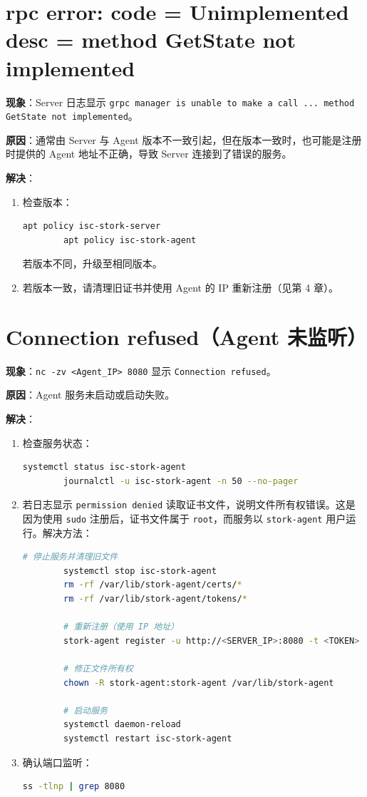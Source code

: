 \documentclass[UTF8, a4paper, 11pt, oneside]{ctexbook}
\begin{document}
\section{rpc error: code = Unimplemented desc = method GetState not implemented}

\textbf{现象}：Server 日志显示 \texttt{grpc manager is unable to make a call ... method GetState not implemented}。

\textbf{原因}：通常由 Server 与 Agent 版本不一致引起，但在版本一致时，也可能是注册时提供的 Agent 地址不正确，导致 Server 连接到了错误的服务。

\textbf{解决}：

\begin{enumerate}
	\item 检查版本：
	\begin{lstlisting}[language=bash]
		apt policy isc-stork-server
		apt policy isc-stork-agent
	\end{lstlisting}
	若版本不同，升级至相同版本。
	\item 若版本一致，请清理旧证书并使用 Agent 的 IP 重新注册（见第 4 章）。
\end{enumerate}

\section{Connection refused（Agent 未监听）}

\textbf{现象}：\verb|nc -zv <Agent_IP> 8080| 显示 \texttt{Connection refused}。

\textbf{原因}：Agent 服务未启动或启动失败。

\textbf{解决}：

\begin{enumerate}
	\item 检查服务状态：
	\begin{lstlisting}[language=bash]
		systemctl status isc-stork-agent
		journalctl -u isc-stork-agent -n 50 --no-pager
	\end{lstlisting}
	\item 若日志显示 \texttt{permission denied} 读取证书文件，说明文件所有权错误。这是因为使用 \texttt{sudo} 注册后，证书文件属于 \texttt{root}，而服务以 \texttt{stork-agent} 用户运行。解决方法：
	\begin{lstlisting}[language=bash]
		# 停止服务并清理旧文件
		systemctl stop isc-stork-agent
		rm -rf /var/lib/stork-agent/certs/*
		rm -rf /var/lib/stork-agent/tokens/*
		
		# 重新注册（使用 IP 地址）
		stork-agent register -u http://<SERVER_IP>:8080 -t <TOKEN>
		
		# 修正文件所有权
		chown -R stork-agent:stork-agent /var/lib/stork-agent
		
		# 启动服务
		systemctl daemon-reload
		systemctl restart isc-stork-agent
	\end{lstlisting}
	\item 确认端口监听：
	\begin{lstlisting}[language=bash]
		ss -tlnp | grep 8080
	\end{lstlisting}
\end{enumerate}
\end{document}
